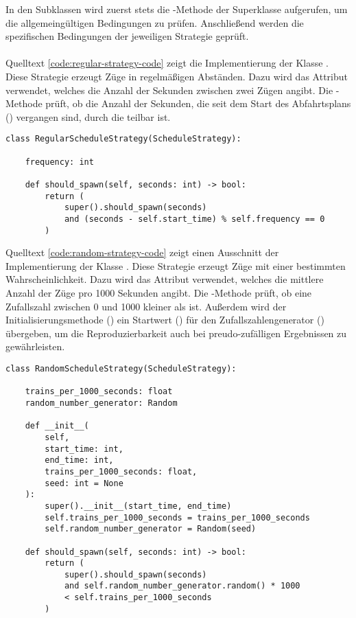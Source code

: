 In den Subklassen wird zuerst stets die -Methode der Superklasse aufgerufen, um die allgemeingültigen Bedingungen zu prüfen. Anschließend werden die spezifischen Bedingungen der jeweiligen Strategie geprüft.\\
\\
Quelltext \ref{code:regular-strategy-code} zeigt die Implementierung der Klasse . Diese Strategie erzeugt Züge in regelmäßigen Abständen. Dazu wird das Attribut  verwendet, welches die Anzahl der Sekunden zwischen zwei Zügen angibt. Die -Methode prüft, ob die Anzahl der Sekunden, die seit dem Start des Abfahrtsplans () vergangen sind, durch die  teilbar ist.\\

\lstset{language=python}
\begin{lstlisting}[caption={Ausschnitt aus der Klasse \code{RegularScheduleStrategy} mit der Implementierung der Methode \code{should\_spawn}.}, label=code:regular-strategy-code]
class RegularScheduleStrategy(ScheduleStrategy):

    frequency: int

    def should_spawn(self, seconds: int) -> bool:
        return (
            super().should_spawn(seconds)
            and (seconds - self.start_time) % self.frequency == 0
        )
\end{lstlisting}

Quelltext \ref{code:random-strategy-code} zeigt einen Ausschnitt der Implementierung der Klasse . Diese Strategie erzeugt Züge mit einer bestimmten Wahrscheinlichkeit. Dazu wird das Attribut  verwendet, welches die mittlere Anzahl der Züge pro 1000 Sekunden angibt. Die -Methode prüft, ob eine Zufallszahl zwischen 0 und 1000 kleiner als  ist. Außerdem wird der Initialisierungsmethode () ein Startwert () für den Zufallszahlengenerator () übergeben, um die Reproduzierbarkeit auch bei preudo-zufälligen Ergebnissen zu gewährleisten.

\begin{lstlisting}[caption={Ausschnitt aus der Klasse \code{RandomScheduleStrategy} mit der Implementierung der Methode \code{should\_spawn}.}, label=code:random-strategy-code]
class RandomScheduleStrategy(ScheduleStrategy):

    trains_per_1000_seconds: float
    random_number_generator: Random

    def __init__(
        self,
        start_time: int,
        end_time: int,
        trains_per_1000_seconds: float,
        seed: int = None
    ):
        super().__init__(start_time, end_time)
        self.trains_per_1000_seconds = trains_per_1000_seconds
        self.random_number_generator = Random(seed)

    def should_spawn(self, seconds: int) -> bool:
        return (
            super().should_spawn(seconds)
            and self.random_number_generator.random() * 1000
            < self.trains_per_1000_seconds
        )
\end{lstlisting}

